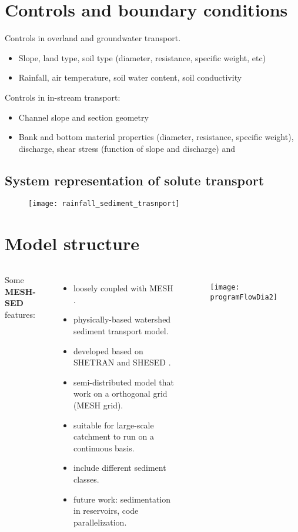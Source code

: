 \documentclass{beamer}
\newcommand{\ms}{\textbf{MESH-SED} }
\begin{document}
\section{Controls and boundary conditions}
\begin{frame}
Controls in overland and groundwater transport.
\begin{itemize}
\item Slope, land type, soil type (diameter, resistance, specific weight, etc)
\item Rainfall, air temperature, soil water content, soil conductivity 
\end{itemize}

Controls in in-stream transport:
\begin{itemize}
\item Channel slope and section geometry
\item Bank and bottom material properties (diameter, resistance, specific weight), discharge, shear stress (function of slope and discharge) and 
\end{itemize}
\end{frame}

\subsection{System representation of solute transport}
\begin{frame}
  \begin{figure}
    \centering
    \texttt{[image: rainfall\_sediment\_trasnport]}
  \end{figure}
\end{frame}

\section{Model structure}
\begin{frame}
\begin{columns}
Some \ms features:
\begin{itemize}
\item loosely coupled with MESH \cite{pietroniro2006using}.
\item physically-based watershed sediment transport model.
\item developed based on SHETRAN \cite{ewen2000shetran} and SHESED \cite{wicks1996shesed}.
\item semi-distributed model that work on a orthogonal grid (MESH grid). 
\item suitable for large-scale catchment to run on a continuous basis.
\item include different sediment classes.
\item future work: sedimentation in reservoirs, code parallelization. 
\end{itemize}
\begin{figure}
\texttt{[image: programFlowDia2]}
\end{figure}
\end{columns}
\end{frame}
\end{document}
